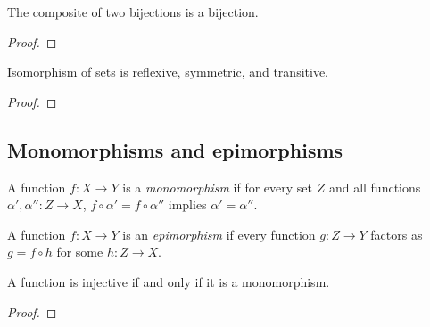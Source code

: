 \begin{exercise}
  \label{exer:prelims:2.3-comp}
  \leanok
  The composite of two bijections is a bijection.
\end{exercise}
\begin{proof}
  \leanok
\end{proof}

\begin{exercise}
  \label{exer:prelims:2.4-iso-equiv}
  \leanok
  Isomorphism of sets is reflexive, symmetric, and transitive.
\end{exercise}
\begin{proof}
  \leanok
\end{proof}

\subsection{Monomorphisms and epimorphisms}
\label{subsec:prelims:functions:monomorphisms-and-epimorphisms}

\begin{definition}[Monomorphism]
  \label{def:prelims:monomorphic}
  \leanok
  A function $f : X \to Y$ is a \emph{monomorphism} if for every set
  $Z$ and all functions $\alpha', \alpha'' : Z \to X$,
  $f \circ \alpha' = f \circ \alpha''$ implies $\alpha' = \alpha''$.
\end{definition}

\begin{definition}[Epimorphism]
  \label{def:prelims:epimorphic}
  \leanok
  A function $f : X \to Y$ is an \emph{epimorphism} if every function
  $g : Z \to Y$ factors as $g = f \circ h$ for some $h : Z \to X$.
\end{definition}

\begin{proposition}[I.2.3]
  \label{prop:prelims:2.3}
  \leanok
  A function is injective if and only if it is a monomorphism.
\end{proposition}
\begin{proof}
  \leanok
\end{proof}

